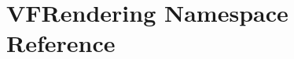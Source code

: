 \hypertarget{namespaceVFRendering}{}\section{V\+F\+Rendering Namespace Reference}
\label{namespaceVFRendering}
